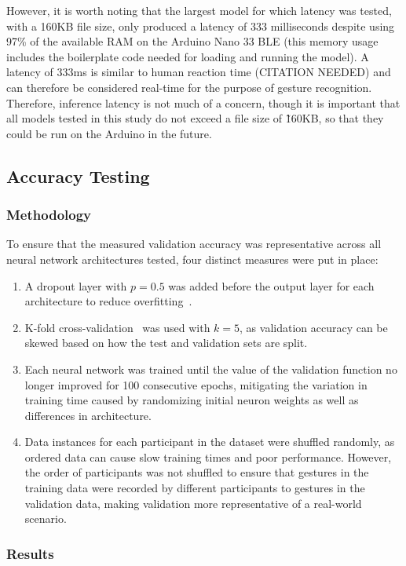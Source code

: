 However, it is worth noting that the largest model for which latency was tested, with a 160KB file size, only produced a latency of 333 milliseconds despite using 97\% of the available RAM on the Arduino Nano 33 BLE (this memory usage includes the boilerplate code needed for loading and running the model).
A latency of 333ms is similar to human reaction time (CITATION NEEDED) and can therefore be considered real-time for the purpose of gesture recognition.
Therefore, inference latency is not much of a concern, though it is important that all models tested in this study do not exceed a file size of \~160KB, so that they could be run on the Arduino in the future.

\subsection{Accuracy Testing}\label{subsec:accuracy-testing}
\subsubsection{Methodology}
To ensure that the measured validation accuracy was representative across all neural network architectures tested, four distinct measures were put in place:
\begin{enumerate}
    \item A dropout layer with $p=0.5$ was added before the output layer for each architecture to reduce overfitting~\cite{JMLR:v15:srivastava14a}.
    \item K-fold cross-validation~\cite{inbook} was used with $k=5$, as validation accuracy can be skewed based on how the test and validation sets are split.
    \item Each neural network was trained until the value of the validation function no longer improved for 100 consecutive epochs, mitigating the variation in training time caused by randomizing initial neuron weights as well as differences in architecture.
    \item Data instances for each participant in the dataset were shuffled randomly, as ordered data can cause slow training times and poor performance.
    However, the order of participants was not shuffled to ensure that gestures in the training data were recorded by different participants to gestures in the validation data, making validation more representative of a real-world scenario.
\end{enumerate}

\subsubsection{Results}

